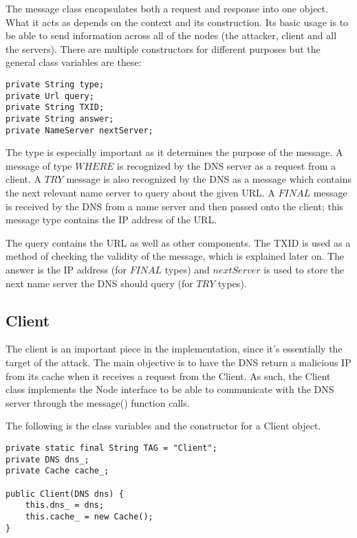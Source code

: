 \documentclass[a4paper, 12pt]{article} %
\begin{document}
The message class encapsulates both a request and response into one object. What it acts as depends on the context and its construction. Its basic usage is to be able to send information across all of the nodes (the attacker, client and all the servers). There are multiple constructors for different purposes but the general class variables are these:

\begin{lstlisting}
private String type;
private Url query;
private String TXID;
private String answer;
private NameServer nextServer;	
\end{lstlisting}

The type is especially important as it determines the purpose of the message. A message of type $WHERE$ is recognized by the DNS server as a request from a client. A $TRY$ message is also recognized by the DNS as a message which contains the next relevant name server to query about the given URL. A $FINAL$ message is received by the DNS from a name server and then passed onto the client; this message type contains the IP address of the URL.

The query contains the URL as well as other components. The TXID is used as a method of checking the validity of the message, which is explained later on. The answer is the IP address (for $FINAL$ types) and $nextServer$ is used to store the next name server the DNS should query (for $TRY$ types).

\subsection*{Client}

The client is an important piece in the implementation, since it's essentially the target of the attack. The main objective is to have the DNS return a malicious IP from its cache when it receives a request from the Client. As such, the Client class implements the Node interface to be able to communicate with the DNS server through the message() function calls. 

The following is the class variables and the constructor for a Client object.

\begin{lstlisting}
private static final String TAG = "Client";	
private DNS dns_;
private Cache cache_;
    	
public Client(DNS dns) {
	this.dns_ = dns;
	this.cache_ = new Cache();
}	
\end{lstlisting}
\end{document}
